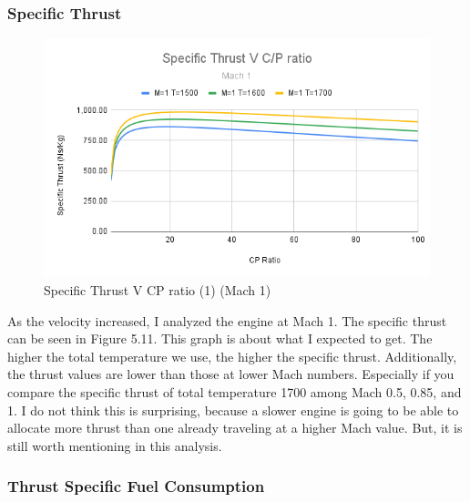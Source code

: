 \documentclass[12pt]{report}
\begin{document}
\subsubsection{Specific Thrust}
\begin{figure}[H]
    \centering
    \includegraphics[width=15.5 cm]{Specific Thrust V C_P ratio (Mach 0.1).png}
    \caption{Specific Thrust V CP ratio (1) (Mach 1)}
    \label{fig:Specific Thrust V C_P ratio (1) (Mach 1)}
\end{figure}


As the velocity increased, I analyzed the engine at Mach 1. The specific thrust can be seen in Figure 5.11.  This graph is about what I expected to get.  The higher the total temperature we use, the higher the specific thrust. Additionally, the thrust values are lower than those at lower Mach numbers. Especially if you compare the specific thrust of total temperature 1700 among Mach 0.5, 0.85, and 1. I do not think this is surprising, because a slower engine is going to be able to allocate more thrust than one already traveling at a higher Mach value.  But, it is still worth mentioning in this analysis.



\subsubsection{Thrust Specific Fuel Consumption}
\end{document}
